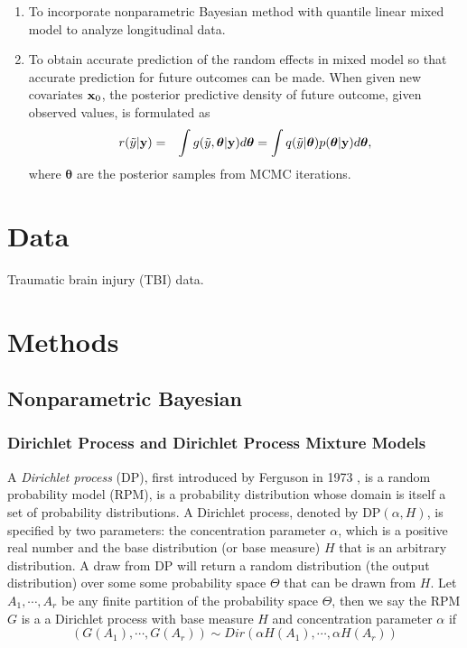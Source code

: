 \documentclass[12pt]{article}
\begin{document}
\begin{enumerate}
\item To incorporate nonparametric Bayesian method with quantile linear mixed model to analyze longitudinal data.

\item To obtain accurate prediction of the random effects in mixed model so that accurate prediction for future outcomes can be made. When given new covariates ${\bf x}_0$, the posterior predictive density of future outcome, given observed values, is formulated as
\begin{eqnarray}\label{eqn:ppv}
r(\tilde{y}|{\bf y})&=&\int g(\tilde{y}, \boldsymbol{\theta}|{\bf y})d\boldsymbol{\theta}=\int q(\tilde{y}|\boldsymbol{\theta})p(\boldsymbol{\theta}|{\bf y})d\boldsymbol{\theta},
\end{eqnarray}
where $\boldsymbol{\theta}$ are the posterior samples from MCMC iterations.
\end{enumerate}


\section{Data}%
Traumatic brain injury (TBI) data.

\section{Methods}%

\subsection{Nonparametric Bayesian}%

\subsubsection{Dirichlet Process and Dirichlet Process Mixture Models}\label{sec:DPM}%
A {\em Dirichlet process} (DP), first introduced by Ferguson in 1973 \cite{ferguson1973bayesian}, is a random probability model (RPM), is a probability distribution whose domain is itself a set of probability distributions. A Dirichlet process, denoted by DP$\left(\alpha, H\right)$,  is specified by two parameters: the concentration parameter $\alpha$, which is a positive real number and the base distribution (or base measure) $H$ that is an arbitrary distribution. A draw from DP will return a random distribution (the output distribution) over some some probability space $\Theta$ that can be drawn from $H$. Let $A_1,\cdots, A_r$ be any finite partition of the probability space $\Theta$, then we say the RPM $G$ is a a Dirichlet process with base measure $H$ and concentration parameter $\alpha$ if 
\begin{equation}\label{eqn:dir_dist}
(G(A_1), \cdots, G(A_r))\sim Dir(\alpha H(A_1), \cdots, \alpha H(A_r))
\end{equation}
\end{document}
